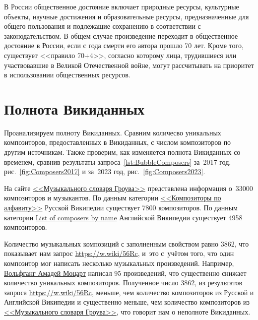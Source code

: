 В России общественное достояние включает природные ресурсы, культурные объекты, 
научные достижения и образовательные ресурсы, 
предназначенные для общего пользования и подлежащие сохранению в соответствии с законодательством. 
В общем случае произведение переходит в общественное достояние в России, 
если с года смерти его автора прошло 70 лет. 
Кроме того, существует <<правило 70+4>>, согласно которому лица, 
трудившиеся или участвовавшие в Великой Отечественной войне, 
могут рассчитывать на приоритет в использовании общественных ресурсов.            



\section{Полнота Викиданных}

Проанализируем полноту Викиданных. 
Сравним количесво уникальных композиторов, предоставленных в Викиданных, 
с числом композиторов по другим источникам. 
Также проверим, как изменяется полнота Викиданных со временем, 
сравнив результаты запроса~\ref{lst:BubbleComposers} за~2017 год, 
рис.~\ref{fig:Composers2017} и за~2023 год, рис.~\ref{fig:Composers2023}.

На сайте  
\href{https://ru.wikipedia.org/?curid=1362802}
     {<<Музыкального словаря Гроува>>} 
представлена информация о~\num{33000} композиторов и музыкантов. 
По данным категории 
\href{https://ru.wikipedia.org/?curid=155531}
     {<<Композиторы по алфавиту>>} 
Русской Википедии существует \num{7800} композиторов. 
По данным категории 
\href{https://en.wikipedia.org/?curid=6921880}
     {List of composers by name} 
Английской Википедии существует \num{4958} композиторов.

Количество музыкальных композиций с заполненным свойством  равно \num{3862}, 
что показывает нам запрос \href{https://w.wiki/56Rc}{https://w.wiki/56Rc}, 
и~это с~учётом того, что один композитор мог написать несколько музыкальных произведений. 
Например, \href{https://ru.wikipedia.org/wiki/Моцарт,_Вольфганг_Амадей}{Вольфганг Амадей Моцарт} 
написал 95 произведений, что существенно снижает количество уникальных композиторов. 
Полученное число 3862, 
из результатов запроса \href{https://w.wiki/56Rc}{https://w.wiki/56Rc}, меньше, 
чем количество композиторов из Русской и Английской Википедии и существенно меньше, 
чем количество композиторов из \href{https://ru.wikipedia.org/wiki/Музыкальный_словарь_Гроува}{<<Музыкального словаря Гроува>>}, что говорит нам о неполноте Викиданных.



